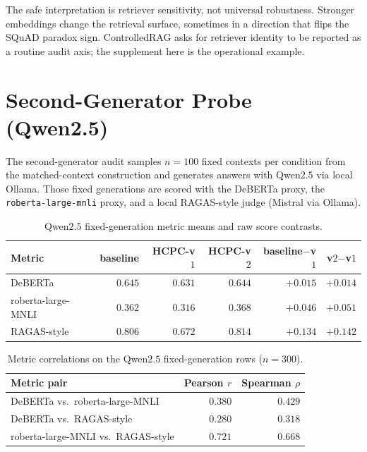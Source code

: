 \documentclass[11pt]{article}
\begin{document}
The safe interpretation is retriever sensitivity, not universal
robustness. Stronger embeddings change the retrieval surface, sometimes
in a direction that flips the SQuAD paradox sign. ControlledRAG asks
for retriever identity to be reported as a routine audit axis;
the supplement here is the operational example.

\section{Second-Generator Probe (Qwen2.5)}
\label{supp:qwen}

The second-generator audit samples $n=100$ fixed contexts per condition
from the matched-context construction and generates answers with
Qwen$2.5$ via local Ollama. Those fixed generations are scored with
the DeBERTa proxy, the \texttt{roberta-large-mnli} proxy, and a local
RAGAS-style judge (Mistral via Ollama).

\begin{table}[!htb]
\centering
\caption{Qwen$2.5$ fixed-generation metric means and raw score
contrasts.}
\footnotesize
\begin{tabular}{lrrrrr}
\toprule
Metric & baseline & HCPC-v$1$ & HCPC-v$2$ & baseline$-$v$1$ & v$2$$-$v$1$ \\
\midrule
DeBERTa             & $0.645$ & $0.631$ & $0.644$ & $+0.015$ & $+0.014$ \\
roberta-large-MNLI  & $0.362$ & $0.316$ & $0.368$ & $+0.046$ & $+0.051$ \\
RAGAS-style         & $0.806$ & $0.672$ & $0.814$ & $+0.134$ & $+0.142$ \\
\bottomrule
\end{tabular}
\end{table}

\begin{table}[!htb]
\centering
\caption{Metric correlations on the Qwen$2.5$ fixed-generation rows
($n=300$).}
\footnotesize
\begin{tabular}{lrr}
\toprule
Metric pair & Pearson $r$ & Spearman $\rho$ \\
\midrule
DeBERTa vs.\ roberta-large-MNLI       & $0.380$ & $0.429$ \\
DeBERTa vs.\ RAGAS-style              & $0.280$ & $0.318$ \\
roberta-large-MNLI vs.\ RAGAS-style   & $0.721$ & $0.668$ \\
\bottomrule
\end{tabular}
\end{table}
\end{document}
